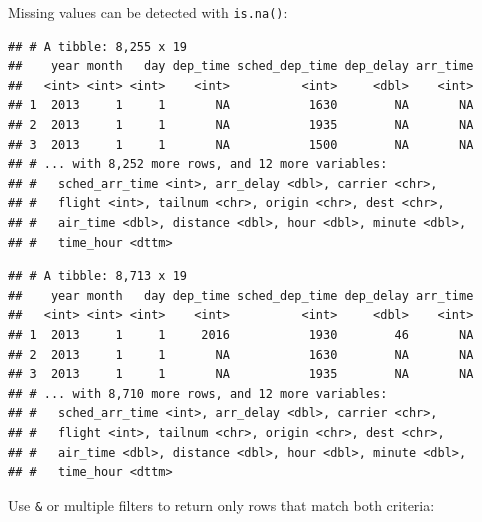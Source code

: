 \documentclass[]{book}
\newenvironment{Shaded}{}{}
\newcommand{\KeywordTok}[1]{\textcolor[rgb]{0.00,0.00,1.00}{#1}}
\newcommand{\NormalTok}[1]{#1}
\newcommand{\OperatorTok}[1]{#1}
\newcommand{\StringTok}[1]{\textcolor[rgb]{0.00,0.50,0.50}{#1}}
\begin{document}
Missing values can be detected with \texttt{is.na()}:

\begin{Shaded}
\end{Shaded}

\begin{verbatim}
## # A tibble: 8,255 x 19
##    year month   day dep_time sched_dep_time dep_delay arr_time
##   <int> <int> <int>    <int>          <int>     <dbl>    <int>
## 1  2013     1     1       NA           1630        NA       NA
## 2  2013     1     1       NA           1935        NA       NA
## 3  2013     1     1       NA           1500        NA       NA
## # ... with 8,252 more rows, and 12 more variables:
## #   sched_arr_time <int>, arr_delay <dbl>, carrier <chr>,
## #   flight <int>, tailnum <chr>, origin <chr>, dest <chr>,
## #   air_time <dbl>, distance <dbl>, hour <dbl>, minute <dbl>,
## #   time_hour <dttm>
\end{verbatim}

\begin{Shaded}
\end{Shaded}

\begin{verbatim}
## # A tibble: 8,713 x 19
##    year month   day dep_time sched_dep_time dep_delay arr_time
##   <int> <int> <int>    <int>          <int>     <dbl>    <int>
## 1  2013     1     1     2016           1930        46       NA
## 2  2013     1     1       NA           1630        NA       NA
## 3  2013     1     1       NA           1935        NA       NA
## # ... with 8,710 more rows, and 12 more variables:
## #   sched_arr_time <int>, arr_delay <dbl>, carrier <chr>,
## #   flight <int>, tailnum <chr>, origin <chr>, dest <chr>,
## #   air_time <dbl>, distance <dbl>, hour <dbl>, minute <dbl>,
## #   time_hour <dttm>
\end{verbatim}

Use \texttt{\&} or multiple filters to return only rows that match both criteria:
\end{document}
